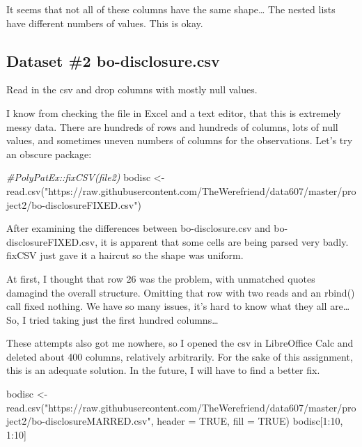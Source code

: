 \documentclass[
]{article}
\newenvironment{Shaded}{\begin{snugshade}}{\end{snugshade}}
\newcommand{\AttributeTok}[1]{\textcolor[rgb]{0.77,0.63,0.00}{#1}}
\newcommand{\CommentTok}[1]{\textcolor[rgb]{0.56,0.35,0.01}{\textit{#1}}}
\newcommand{\ConstantTok}[1]{\textcolor[rgb]{0.00,0.00,0.00}{#1}}
\newcommand{\DecValTok}[1]{\textcolor[rgb]{0.00,0.00,0.81}{#1}}
\newcommand{\FunctionTok}[1]{\textcolor[rgb]{0.00,0.00,0.00}{#1}}
\newcommand{\NormalTok}[1]{#1}
\newcommand{\OtherTok}[1]{\textcolor[rgb]{0.56,0.35,0.01}{#1}}
\newcommand{\SpecialCharTok}[1]{\textcolor[rgb]{0.00,0.00,0.00}{#1}}
\newcommand{\StringTok}[1]{\textcolor[rgb]{0.31,0.60,0.02}{#1}}
\begin{document}
It seems that not all of these columns have the same shape\ldots{} The
nested lists have different numbers of values. This is okay.

\hypertarget{dataset-2-bo-disclosure.csv}{%
\subsection{Dataset \#2
bo-disclosure.csv}\label{dataset-2-bo-disclosure.csv}}

Read in the csv and drop columns with mostly null values.

I know from checking the file in Excel and a text editor, that this is
extremely messy data. There are hundreds of rows and hundreds of
columns, lots of null values, and sometimes uneven numbers of columns
for the observations. Let's try an obscure package:

\begin{Shaded}
\begin{Highlighting}[]
\CommentTok{\#PolyPatEx::fixCSV(file2)}
\NormalTok{bodisc }\OtherTok{\textless{}{-}} \FunctionTok{read.csv}\NormalTok{(}\StringTok{"https://raw.githubusercontent.com/TheWerefriend/data607/master/project2/bo{-}disclosureFIXED.csv"}\NormalTok{)}
\end{Highlighting}
\end{Shaded}

After examining the differences between bo-disclosure.csv and
bo-disclosureFIXED.csv, it is apparent that some cells are being parsed
very badly. fixCSV just gave it a haircut so the shape was uniform.

At first, I thought that row 26 was the problem, with unmatched quotes
damagind the overall structure. Omitting that row with two reads and an
rbind() call fixed nothing. We have so many issues, it's hard to know
what they all are\ldots{} So, I tried taking just the first hundred
columns\ldots{}

These attempts also got me nowhere, so I opened the csv in LibreOffice
Calc and deleted about 400 columns, relatively arbitrarily. For the sake
of this assignment, this is an adequate solution. In the future, I will
have to find a better fix.

\begin{Shaded}
\begin{Highlighting}[]
\NormalTok{bodisc }\OtherTok{\textless{}{-}} \FunctionTok{read.csv}\NormalTok{(}\StringTok{"https://raw.githubusercontent.com/TheWerefriend/data607/master/project2/bo{-}disclosureMARRED.csv"}\NormalTok{, }\AttributeTok{header =} \ConstantTok{TRUE}\NormalTok{, }\AttributeTok{fill =} \ConstantTok{TRUE}\NormalTok{)}
\NormalTok{bodisc[}\DecValTok{1}\SpecialCharTok{:}\DecValTok{10}\NormalTok{, }\DecValTok{1}\SpecialCharTok{:}\DecValTok{10}\NormalTok{]}
\end{Highlighting}
\end{Shaded}
\end{document}
